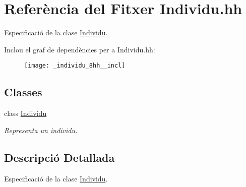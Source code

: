 \hypertarget{_individu_8hh}{}\section{Referència del Fitxer Individu.\+hh}
\label{_individu_8hh}


Especificació de la clase \hyperlink{class_individu}{Individu}.  


Inclou el graf de dependències per a Individu.\+hh\+:\nopagebreak
\begin{figure}[H]
\begin{center}
\leavevmode
\texttt{[image: \_individu\_8hh\_\_incl]}
\end{center}
\end{figure}
\subsection*{Classes}
\begin{DoxyCompactItemize}
\item 
class \hyperlink{class_individu}{Individu}
\begin{DoxyCompactList}\small\item\em Representa un individu. \end{DoxyCompactList}\end{DoxyCompactItemize}


\subsection{Descripció Detallada}
Especificació de la clase \hyperlink{class_individu}{Individu}. 

